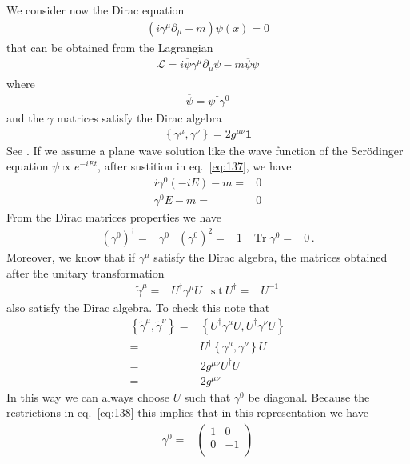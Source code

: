 We consider now the Dirac equation
\begin{align}
\label{eq:137}
  (i\gamma^\mu\partial_\mu-m)\psi(x)=0
\end{align}
that can be obtained from the Lagrangian
\begin{align}
  \mathcal{L}=i\overline{\psi}\gamma^\mu\partial_\mu\psi-m\overline{\psi}\psi
\end{align}
where
\begin{align}
  \overline{\psi}=\psi^\dagger\gamma^0
\end{align}
and the $\gamma$ matrices satisfy the Dirac algebra
\begin{align}
\label{eq:140}
\left\{\gamma^\mu,\gamma^\nu\right\} = 2g^{\mu\nu}\mathbf{1}
\end{align}
See \cite{lsm}.
If we assume a plane wave solution like the wave function of the Scr\"odinger equation $\psi\propto e^{-i E t}$, after sustition in eq.~\eqref{eq:137}, we have
\begin{align}
  \label{eq:139}
  i \gamma^0 (-i E)-m=&0\nonumber\\
   \gamma^0 E-m=&0
\end{align}
From the Dirac matrices properties we have
\begin{align}
  \label{eq:138}
\left(\gamma^0\right)^\dagger=&\gamma^0 & \left(\gamma^0\right)^2=&1 & \operatorname{Tr}\gamma^0=&0\,.
\end{align}
Moreover, we know that if $\gamma^\mu$ satisfy the Dirac algebra, the matrices obtained after the unitary transformation
\begin{align}
  \widetilde{\gamma}^\mu=&U^\dagger \gamma^\mu U & \text{s.t}\ U^\dagger=&U^{-1}
\end{align}
also satisfy the Dirac algebra. To check this note that
\begin{align}
  \left\{\widetilde{\gamma}^\mu,\widetilde{\gamma}^\nu\right\}=&
   \left\{U^\dagger{\gamma}^\mu U,U^\dagger{\gamma}^\nu U\right\}\nonumber\\
=&U^\dagger\left\{{\gamma}^\mu,{\gamma}^\nu\right\}U\nonumber\\
=&2g^{\mu\nu}U^\dagger U\nonumber\\
=&2g^{\mu\nu}
\end{align}
In this way we can always choose $U$ such that $\gamma^0$ be diagonal. Because the restrictions in eq.~\eqref{eq:138} this implies that in this representation we have
\begin{align}
  \gamma^0=&\begin{pmatrix}
    1 & 0 \\
    0 & -1\\
  \end{pmatrix}
\end{align}
